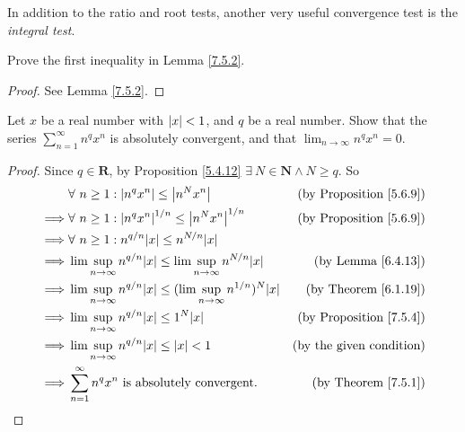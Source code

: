 \begin{remark}\label{7.5.5}
    In addition to the ratio and root tests, another very useful convergence test is the \emph{integral test}.
\end{remark}

\exercisesection

\begin{exercise}\label{ex 7.5.1}
    Prove the first inequality in Lemma \ref{7.5.2}.
\end{exercise}

\begin{proof}
    See Lemma \ref{7.5.2}.
\end{proof}

\begin{exercise}\label{ex 7.5.2}
    Let \(x\) be a real number with \(\abs*{x} < 1\), and \(q\) be a real number.
    Show that the series \(\sum_{n = 1}^\infty n^q x^n\) is absolutely convergent, and that \(\lim_{n \to \infty} n^q x^n = 0\).
\end{exercise}

\begin{proof}
    Since \(q \in \mathbf{R}\), by Proposition \ref{5.4.12} \(\exists\ N \in \mathbf{N} \land N \geq q\).
    So
    \begin{align*}
                 & \forall\ n \geq 1 : \abs*{n^q x^n} \leq \abs*{n^N x^n}                                         & \text{(by Proposition \ref{5.6.9})} \\
        \implies & \forall\ n \geq 1 : \abs*{n^q x^n}^{1 / n} \leq \abs*{n^N x^n}^{1 / n}                         & \text{(by Proposition \ref{5.6.9})} \\
        \implies & \forall\ n \geq 1 : n^{q / n} \abs*{x} \leq n^{N / n} \abs*{x}                                                                       \\
        \implies & \lim\sup_{n \to \infty} n^{q / n} \abs*{x} \leq \lim\sup_{n \to \infty} n^{N / n} \abs*{x}     & \text{(by Lemma \ref{6.4.13})}      \\
        \implies & \lim\sup_{n \to \infty} n^{q / n} \abs*{x} \leq (\lim\sup_{n \to \infty} n^{1 / n})^N \abs*{x} & \text{(by Theorem \ref{6.1.19})}    \\
        \implies & \lim\sup_{n \to \infty} n^{q / n} \abs*{x} \leq 1^N \abs*{x}                                   & \text{(by Proposition \ref{7.5.4})} \\
        \implies & \lim\sup_{n \to \infty} n^{q / n} \abs*{x} \leq \abs*{x} < 1                                   & \text{(by the given condition)}     \\
        \implies & \sum_{n = 1}^\infty n^q x^n \text{ is absolutely convergent}.                                  & \text{(by Theorem \ref{7.5.1})}
    \end{align*}
\end{proof}

